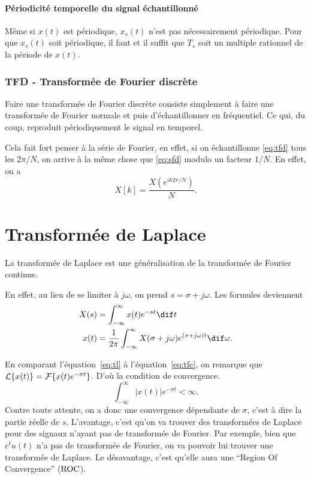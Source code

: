 \paragraph{Périodicité temporelle du signal échantillonné}
Même si $x(t)$ est périodique,
$x_s(t)$ n'est pas nécessairement périodique.
Pour que $x_s(t)$ soit périodique, il faut et il suffit que
$T_s$ soit un multiple rationnel de la période de $x(t)$.

\subsubsection{TFD - Transformée de Fourier discrète}
Faire une transformée de Fourier discrète consiste simplement à faire une
transformée de Fourier normale et puis d'échantillonner en fréquentiel.
Ce qui, du coup, reproduit périodiquement le signal en temporel.

Cela fait fort penser à la série de Fourier, en effet,
si on échantillonne \eqref{eq:tfd} tous les $2\pi/N$, on arrive
à la même chose que \eqref{eq:sfd} modulo un facteur $1/N$.
En effet, on a
\[ X[k] = \frac{X(e^{ik2\pi/N})}{N}. \]

\section{Transformée de Laplace}
La transformée de Laplace est une généralisation de la transformée de Fourier
continue.

En effet, au lieu de se limiter à $j\omega$, on prend $s = \sigma + j\omega$.
Les formules deviennent
\begin{align}
  \label{eq:tl}
  X(s) & = \int_{-\infty}^\infty x(t) e^{-st} \dif t\\
  \nonumber
  x(t) & = \frac{1}{2\pi}\int_{-\infty}^\infty X(\sigma+j\omega)
  e^{(\sigma+j\omega)t} \dif \omega.
\end{align}

En comparant l'équation~\ref{eq:tl} à l'équation~\ref{eq:tfc}, on remarque que
$\mathcal{L}\{x(t)\} = \mathcal{F}\{x(t) e^{-\sigma t}\}$.
D'où la condition de convergence.
\[ \int_{-\infty}^\infty |x(t)|e^{-\sigma t} < \infty. \]
Contre toute attente, on a donc une convergence dépendante de $\sigma$, c'est
à dire la partie réelle de $s$.
L'avantage, c'est qu'on va trouver des transformées de Laplace pour des
signaux n'ayant pas de transformée de Fourier.
Par exemple, bien que $e^tu(t)$ n'a pas de transformée de Fourier,
on va pouvoir lui trouver une transformée de Laplace.
Le désavantage, c'est qu'elle aura une ``Region Of Convergence'' ($\mathrm{ROC}$).

